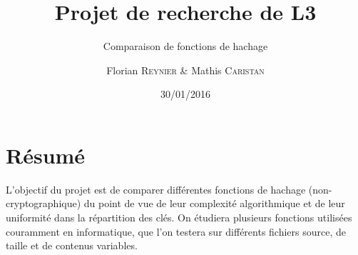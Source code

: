 \documentclass[final,twoside,twocolumn,10pt]{scrartcl}
\begin{document}
%
\title{Projet de recherche de L3}
\subtitle{Comparaison de fonctions de hachage}
\author{Florian \textsc{Reynier} \& Mathis \textsc{Caristan}}
%
\date{30/01/2016}

\maketitle

\section*{Résumé}
	\label{sec:resume}
	L'objectif du projet est de comparer différentes fonctions de hachage (non-cryptographique) du point de vue de leur complexité algorithmique et de leur uniformité dans la répartition des clés. On étudiera plusieurs fonctions utilisées couramment en informatique, que l'on testera sur différents fichiers source, de taille et de contenus variables.
	
	
\end{document}
